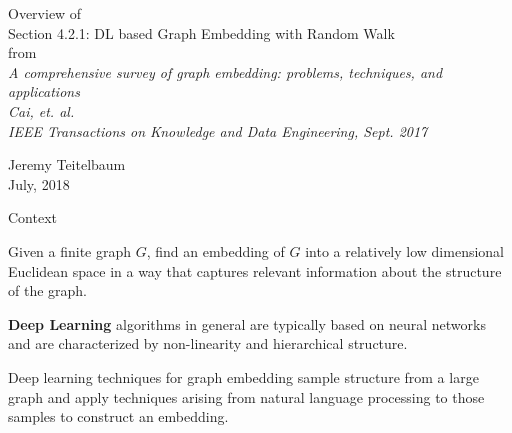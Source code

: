 \documentclass{beamer}
\begin{document}
\begin{frame}
\begin{center}
Overview of \\
Section 4.2.1: DL based Graph Embedding with Random Walk \\
from \\
\textit{A comprehensive survey of graph embedding: problems, techniques, and applications} \\
\textit{Cai, et. al.} \\
\textit{IEEE Transactions on Knowledge and Data Engineering, Sept. 2017} \\
\end{center}

Jeremy Teitelbaum \\
July, 2018

\end{frame}
\begin{frame}{Context}
\begin{problem}
Given a finite graph $G$, find an embedding of $G$ into a relatively low dimensional Euclidean space in a way that captures
relevant information about the structure of the graph.
\end{problem}
\bigskip\noindent
\textbf{Deep Learning} algorithms in general are typically based on neural networks and are characterized by non-linearity and hierarchical structure.  

\bigskip\noindent
Deep learning techniques for graph embedding sample structure from a large graph and apply techniques arising from
natural language processing to those samples to construct an embedding.
\end{frame}
\end{document}
